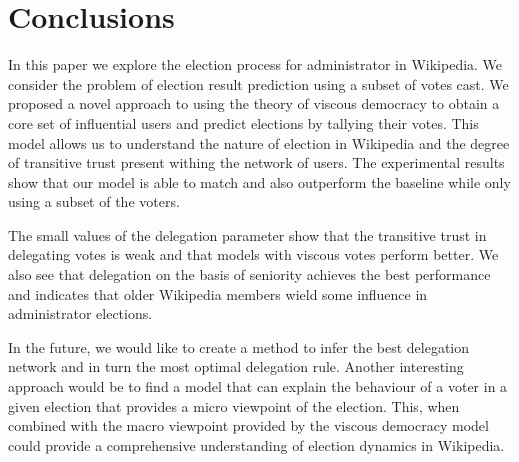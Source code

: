 \section{Conclusions}
\label{sec:conclusion}
In this paper we explore the election process for administrator in Wikipedia. We consider the problem of election result prediction using a subset of votes cast. We proposed a novel approach to using the theory of viscous democracy to obtain a core set of influential users and predict elections by tallying their votes. This model allows us to understand the nature of election in Wikipedia and the degree of transitive trust present withing the network of users. The experimental results show that our model is able to match and also outperform the baseline while only using a subset of the voters.

The small values of the delegation parameter show that the transitive trust in delegating votes is weak and that models with viscous votes perform better. We also see that delegation on the basis of seniority achieves the best performance and indicates that older Wikipedia members wield some influence in administrator elections.

In the future, we would like to create a method to infer the best delegation network and in turn the most optimal delegation rule. Another interesting approach would be to find a model that can explain the behaviour of a voter in a given election that provides a micro viewpoint of the election. This, when combined with the macro viewpoint provided by the viscous democracy model could provide a comprehensive understanding of election dynamics in Wikipedia.